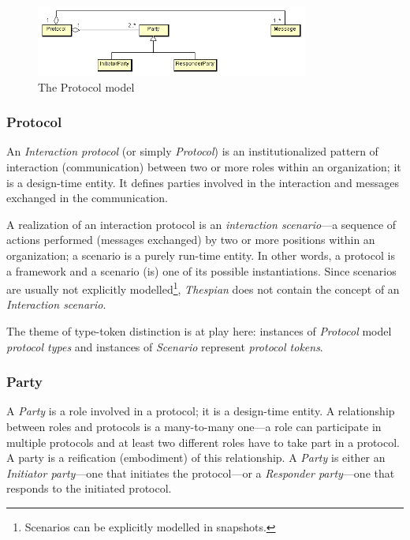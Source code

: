 \begin{figure}[ht]
	\centering
	\includegraphics[width=0.8\textwidth]{images/thespian/protocol-model}
	\caption{The Protocol model}
	\label{figure:thespian-protocol-model}
\end{figure}

\subsubsection*{Protocol}

An \textit{Interaction protocol} (or simply \textit{Protocol}) is an institutionalized pattern of interaction (communication) between two or more roles within an organization; it is a design-time entity.
It defines parties involved in the interaction and messages exchanged in the communication.

A realization of an interaction protocol is an \textit{interaction scenario}---a sequence of actions performed (messages exchanged) by two or more positions within an organization; a scenario is a purely run-time entity.
In other words, a protocol is a framework and a scenario (is) one of its possible instantiations.
Since scenarios are usually not explicitly modelled\footnote{Scenarios can be explicitly modelled in snapshots.}, \textit{Thespian} does not contain the concept of an \textit{Interaction scenario}.

The theme of type-token distinction is at play here: instances of \textit{Protocol} model \textit{protocol types} and instances of \textit{Scenario} represent \textit{protocol tokens}.

\subsubsection*{Party}

A \textit{Party} is a role involved in a protocol; it is a design-time entity.
A relationship between roles and protocols is a many-to-many one---a role can participate in multiple protocols and at least two different roles have to take part in a protocol.
A party is a reification (embodiment) of this relationship.
A \textit{Party} is either an \textit{Initiator party}---one that initiates the protocol---or a \textit{Responder party}---one that responds to the initiated protocol.

